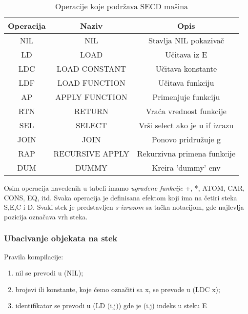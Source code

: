 \begin{table}[h!]
	\begin{center}
	\caption{Operacije koje podržava SECD mašina}
	\begin{tabular}{|c|c|c|} \hline
	Operacija&Naziv&Opis\\ \hline
	NIL & NIL & Stavlja NIL pokazivač\\ \hline
	LD & LOAD & Učitava iz E \\ \hline
	LDC & LOAD CONSTANT & Učitava konstante\\ \hline
	LDF & LOAD FUNCTION & Učitava funkciju \\ \hline
	AP & APPLY FUNCTION & Primenjuje funkciju\\ \hline
	RTN & RETURN & Vraća vrednost funkcije \\ \hline
	SEL & SELECT & Vrši select ako je u if izrazu\\ \hline
	JOIN & JOIN & Ponovo pridružuje g\\ \hline
	RAP & RECURSIVE APPLY & Rekurzivna primena funkcije\\ \hline
	DUM & DUMMY & Kreira 'dummy' env \\ \hline
	\end{tabular}
	\label{tab:tabelaInstr}
	\end{center}
\end{table}
Osim operacija navedenih u tabeli imamo {\em ugrađene funkcije} +, *, ATOM, CAR, CONS, EQ, itd. Svaka operacija je definisana efektom koji ima na četiri steka S,E,C i D. Svaki stek je predstavljen {\em s-izrazom} sa tačka notacijom, gde najlevlja pozicija označava vrh steka.

\subsubsection{Ubacivanje objekata na stek}

Pravila kompilacije:
\begin{enumerate}
\item nil se prevodi u (NIL);
\item brojevi ili konstante, koje ćemo označiti sa x, se prevode u (LDC x);
\item identifikator se prevodi u (LD (i,j)) gde je (i.j) indeks u steku E
\end{enumerate}

